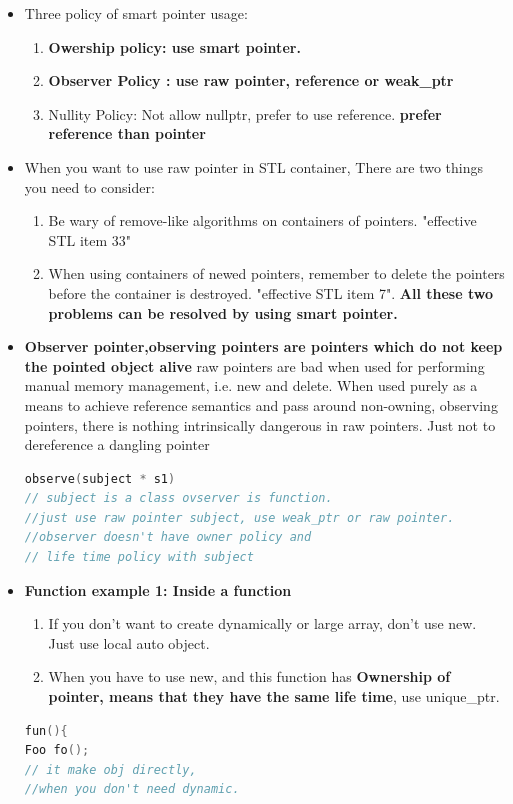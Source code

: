 \documentclass[a4paper,12pt,twoside]{book}
\begin{document}
\begin{itemize}
\begin{enumerate}
\end{enumerate}


\item Three policy of smart pointer usage:
\begin{enumerate}
\item \textbf{Owership policy: use smart pointer.}
\item \textbf{Observer Policy : use raw pointer, reference or weak\_ptr}
\item Nullity Policy: Not allow nullptr, prefer to use reference. \textbf{prefer reference than pointer}
\end{enumerate}


\item When you want to use raw pointer in STL container, There are two things you need to consider:
\begin{enumerate}
\item  Be wary of remove-like algorithms on containers of pointers. "effective STL item 33"
\item When using containers of newed pointers, remember to delete the pointers before the container is destroyed. "effective STL item 7". \textbf{All these two problems can be resolved by using smart pointer.}
\end{enumerate}

\item \textbf{Observer pointer,observing pointers are pointers which do not keep the pointed object alive} raw pointers are bad when used for performing manual memory management, i.e. new and delete. When used purely as a means to achieve reference semantics and pass around non-owning, observing pointers, there is nothing intrinsically dangerous in raw pointers. Just not to dereference a dangling pointer
\begin{lstlisting}[frame=single, language=c++]
observe(subject * s1)
// subject is a class ovserver is function.
//just use raw pointer subject, use weak_ptr or raw pointer.
//observer doesn't have owner policy and
// life time policy with subject
\end{lstlisting}

\item \textbf{Function example 1: Inside a function}
\begin{enumerate}
\item If you don't want to create dynamically or large array, don't use new. Just use local auto object.
\item When you have to use new, and this function has \textbf{Ownership of pointer, means that they have the same life time},  use unique\_ptr.
\end{enumerate}
\begin{lstlisting}[frame=single, language=c++]
fun(){
Foo fo();
// it make obj directly,
//when you don't need dynamic.


\end{lstlisting}
\end{itemize}
\end{document}
